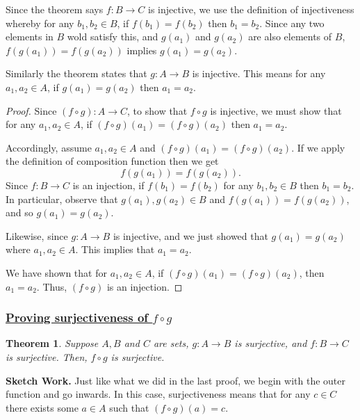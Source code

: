 \documentclass{amsart}
\newtheorem{thrm}{Theorem}
\theoremstyle{definition}
\theoremstyle{definition}
\theoremstyle{remark}
\begin{document}
Since the theorem says $f:B\rightarrow C$ is injective, we use the definition of injectiveness whereby for any $b_1,b_2\in B$, if $f(b_1)=f(b_2)$ then $b_1=b_2$. Since any two elements in $B$ wold satisfy this, and $g(a_1)$ and $g(a_2)$ are also elements of $B$, $f(g(a_1))=f(g(a_2))$ implies $g(a_1)=g(a_2)$.


Similarly the theorem states that $g:A\rightarrow B$ is injective. This means for any $a_1, a_2\in A$, if $g(a_1)=g(a_2)$ then $a_1=a_2$.

\begin{proof}
      Since $(f\circ g):A\rightarrow C$, to show that $f\circ g$ is injective, we must show that for any $a_1,a_2\in A$, if $(f\circ g)(a_1)=(f\circ g)(a_2)$ then $a_1=a_2$.


      Accordingly, assume $a_1,a_2\in A$ and $(f\circ g)(a_1)=(f\circ g)(a_2)$. If we apply the definition of composition function then we get
      \[f(g(a_1)) = f(g(a_2)).\]
      Since $f:B\rightarrow C$ is an injection, if $f(b_1)=f(b_2)$ for any $b_1,b_2\in B$ then $b_1=b_2$. In particular, observe that $g(a_1),g(a_2)\in B$ and $f(g(a_1))=f(g(a_2))$, and so $g(a_1)=g(a_2)$.


      Likewise, since $g:A\rightarrow B$ is injective, and we just showed that $g(a_1)=g(a_2)$ where $a_1,a_2\in A$. This implies that $a_1=a_2$.


      We have shown that for $a_1,a_2\in A$, if $(f\circ g)(a_1)=(f\circ g)(a_2)$, then $a_1=a_2$. Thus, $(f\circ g)$ is an injection.
\end{proof}





\bigskip \bigskip

\subsubsection{\underline{Proving surjectiveness of $f\circ g$}}\hspace*{\fill}
\medskip


\begin{thrm}
      Suppose $A, B$ and $C$ are sets, $g:A\rightarrow B$ is surjective, and $f:B\rightarrow C$ is surjective. Then, $f\circ g$ is surjective.
\end{thrm}

\noindent \textbf{Sketch Work.} Just like what we did in the last proof, we begin with the outer function and go inwards. In this case, surjectiveness means that for any $c\in C$ there exists some $a\in A$ such that $(f\circ g)(a)=c$.
\end{document}
